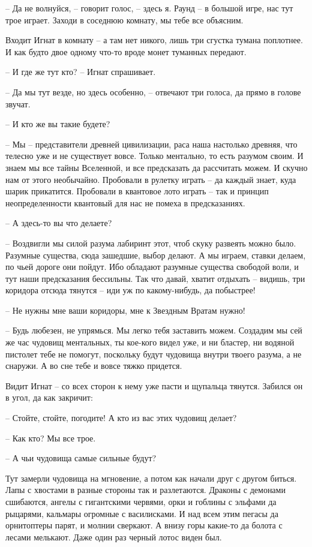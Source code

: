 \documentclass[ebook,oneside,final,openright]{memoir}
\begin{document}
– Да не волнуйся, – говорит голос, – здесь я. Раунд – в большой игре, нас тут трое играет. Заходи в соседнюю комнату, мы тебе все объясним.\par
 \par
Входит Игнат в комнату – а там нет никого, лишь три сгустка тумана поплотнее. И как будто двое одному что-то вроде монет туманных передают.\par
– И где же тут кто? – Игнат спрашивает.\par
– Да мы тут везде, но здесь особенно, – отвечают три голоса, да прямо в голове звучат.\par
– И кто же вы такие будете?\par
– Мы – представители древней цивилизации, раса наша настолько древняя, что телесно уже и не существует вовсе. Только ментально, то есть разумом своим. И знаем мы все тайны Вселенной, и все предсказать да рассчитать можем. И скучно нам от этого необычайно. Пробовали в рулетку играть – да каждый знает, куда шарик прикатится. Пробовали в квантовое лото играть – так и принцип неопределенности квантовый для нас не помеха в предсказаниях.\par
– А здесь-то вы что делаете?\par
– Воздвигли мы силой разума лабиринт этот, чтоб скуку развеять можно было. Разумные существа, сюда зашедшие, выбор делают. А мы играем, ставки делаем, по чьей дороге они пойдут. Ибо обладают разумные существа свободой воли, и тут наши предсказания бессильны. Так что давай, хватит отдыхать – видишь, три коридора отсюда тянутся – иди уж по какому-нибудь, да побыстрее!\par
– Не нужны мне ваши коридоры, мне к Звездным Вратам нужно!\par
– Будь любезен, не упрямься. Мы легко тебя заставить можем. Создадим мы сей же час чудовищ ментальных, ты кое-кого видел уже, и ни бластер, ни водяной пистолет тебе не помогут, поскольку будут чудовища внутри твоего разума, а не снаружи. А во сне тебе и вовсе тяжко придется.\par
\par
Видит Игнат – со всех сторон к нему уже пасти и щупальца тянутся. Забился он в угол, да как закричит:\par
– Стойте, стойте, погодите! А кто из вас этих чудовищ делает?\par
– Как кто? Мы все трое.\par
– А чьи чудовища самые сильные будут?\par
Тут замерли чудовища на мгновение, а потом как начали друг с другом биться. Лапы с хвостами в разные стороны так и разлетаются. Драконы с демонами сшибаются, ангелы с гигантскими червями, орки и гоблины с эльфами да рыцарями, кальмары огромные с василисками. И над всем этим пегасы да орнитоптеры парят, и молнии сверкают. А внизу горы какие-то да болота с лесами мелькают. Даже один раз черный лотос виден был. \par
\end{document}
